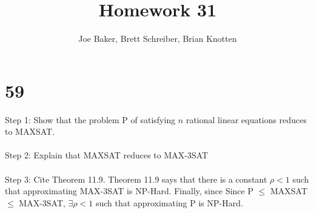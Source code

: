 \documentclass[letterpaper,notitlepage,twoside]{article}
\begin{document}
\title{Homework 31}
\author{Joe Baker, Brett Schreiber, Brian Knotten}
\maketitle

\section*{59}
Step 1: Show that the problem P of satisfying $n$ rational linear equations reduces to MAXSAT.
\\\\
Step 2: Explain that MAXSAT reduces to MAX-3SAT
\\\\
Step 3: Cite Theorem 11.9. Theorem 11.9 says that there is a constant $\rho < 1$ such that approximating MAX-3SAT is NP-Hard. Finally, since Since P $\leq$ MAXSAT $\leq$ MAX-3SAT, $\exists \rho < 1$ such that approximating P is NP-Hard.
\end{document}
